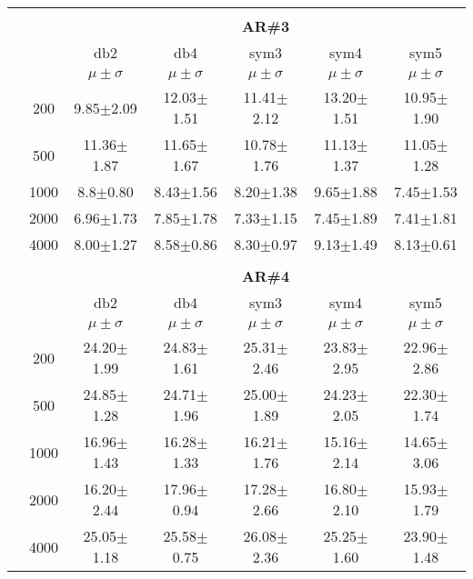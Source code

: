 \begin{table}[H]
\begin{tabular}{|c|c|c c c c c|}
	


\\ \midrule
\multicolumn{7}{c}{}\\ 



\cline{3-7}
\multicolumn{2}{c|}{\multirow{3}{*}{}} & \multicolumn{5}{c|}{\textbf{AR\#3}}   \\\cline{3-7} 

\multicolumn{2}{c|}{}  & db2 & db4 & sym3 & sym4 & sym5 \\\cline{3-7}
\multicolumn{2}{c|}{}& $\mu \pm \sigma$ & $\mu \pm \sigma$ & $\mu \pm \sigma$ & $\mu \pm \sigma$ & $\mu \pm \sigma$ \\\hline

\multicolumn{1}{|c|}{ \multirow{5}{*}{\rotatebox[origin=c]{90}{\textbf{Neurônios}}} }
&200	&9.85$\pm$2.09	&12.03$\pm$1.51	&11.41$\pm$2.12	&13.20$\pm$1.51	&10.95$\pm$1.90\\\cline{2-7}
&500	&11.36$\pm$1.87	&11.65$\pm$1.67	&10.78$\pm$1.76	&11.13$\pm$1.37	&11.05$\pm$1.28\\\cline{2-7}
&1000	&8.8$\pm$0.80	&8.43$\pm$1.56	&8.20$\pm$1.38	&9.65$\pm$1.88	&7.45$\pm$1.53\\\cline{2-7}
&2000	&6.96$\pm$1.73	&7.85$\pm$1.78	&7.33$\pm$1.15	&7.45$\pm$1.89	&7.41$\pm$1.81\\\cline{2-7}
&4000	&8.00$\pm$1.27	&8.58$\pm$0.86	&8.30$\pm$0.97	&9.13$\pm$1.49	&8.13$\pm$0.61




\\\midrule 
\multicolumn{7}{c}{}\\ 



\cline{3-7}
\multicolumn{2}{c|}{\multirow{3}{*}{}} & \multicolumn{5}{c|}{\textbf{AR\#4}}   \\\cline{3-7} 

\multicolumn{2}{c|}{}  & db2 & db4 & sym3 & sym4 & sym5 \\\cline{3-7}
\multicolumn{2}{c|}{}& $\mu \pm \sigma$ & $\mu \pm \sigma$ & $\mu \pm \sigma$ & $\mu \pm \sigma$ & $\mu \pm \sigma$ \\\hline

\multicolumn{1}{|c|}{ \multirow{5}{*}{\rotatebox[origin=c]{90}{\textbf{Neurônios}}} }
&200	&24.20$\pm$1.99	&24.83$\pm$1.61	&25.31$\pm$2.46	&23.83$\pm$2.95	&22.96$\pm$2.86\\\cline{2-7}
&500	&24.85$\pm$1.28	&24.71$\pm$1.96	&25.00$\pm$1.89	&24.23$\pm$2.05	&22.30$\pm$1.74\\\cline{2-7}
&1000	&16.96$\pm$1.43	&16.28$\pm$1.33	&16.21$\pm$1.76	&15.16$\pm$2.14	&14.65$\pm$3.06\\\cline{2-7}
&2000	&16.20$\pm$2.44	&17.96$\pm$0.94	&17.28$\pm$2.66	&16.80$\pm$2.10	&15.93$\pm$1.79\\\cline{2-7}
&4000	&25.05$\pm$1.18	&25.58$\pm$0.75	&26.08$\pm$2.36	&25.25$\pm$1.60	&23.90$\pm$1.48


\\\midrule
	\end{tabular}

\end{table} %

